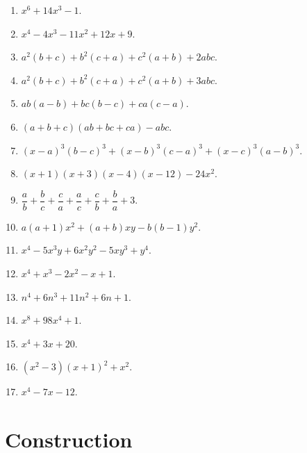 \documentclass[11pt, a4paper]{article}
\begin{document}
\begin{enumerate}
	\item $ x^6 + 14x^3 - 1 $.
	
	\item $ x^4 - 4x^3 - 11x^2 + 12x + 9 $.

	\item $ a^2(b+c) + b^2(c+a) + c^2(a+b) + 2abc $.

	\item $ a^2(b+c) + b^2(c+a) + c^2(a+b) + 3abc $.

	\item $ ab(a-b) + bc(b-c) + ca(c-a) $.

	\item $ (a+b+c)(ab+bc+ca) - abc $.
	
	\item $ (x-a)^3 (b-c)^3 + (x-b)^3 (c-a)^3 + (x-c)^3 (a-b)^3 $.

	\item $ (x+1) (x+3) (x-4) (x-12) - 24x^2 $.
	
	\item $ \dfrac{a}{b} + \dfrac{b}{c} + \dfrac{c}{a} + \dfrac{a}{c} + \dfrac{c}{b} + \dfrac{b}{a} + 3 $.
	
	\item $ a(a+1)x^2 + (a+b)xy - b(b-1)y^2 $.
	
	\item $ x^4 - 5x^3y + 6x^2y^2 - 5xy^3 + y^4  $.
	
	\item $ x^4 + x^3 - 2x^2 - x + 1  $.
	
	\item $ n^4 + 6n^3 + 11n^2 + 6n + 1 $.
	
	\item $ x^8 + 98x^4 + 1 $.

	\item $ x^4 + 3x +20 $.
	
	\item $ (x^2 - 3)(x + 1)^2 + x^2 $.
	
	\item $ x^4 - 7x - 12 $.



\end{enumerate}





\section{Construction}
\end{document}
